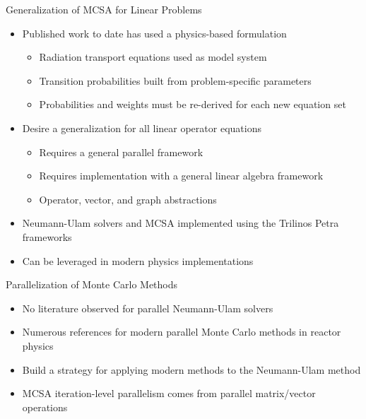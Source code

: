 \documentclass{beamer}
\begin{document}
\begin{frame}{Generalization of MCSA for Linear Problems}

  \begin{itemize}
  \item Published work to date has used a physics-based formulation
    \begin{itemize}
    \item Radiation transport equations used as model system
    \item Transition probabilities built from problem-specific
      parameters
    \item Probabilities and weights must be re-derived for each new
      equation set
    \end{itemize}
    \medskip \medskip
  \item Desire a generalization for all linear operator equations
    \begin{itemize}
    \item Requires a general parallel framework
    \item Requires implementation with a general linear algebra
      framework
    \item Operator, vector, and graph abstractions
    \end{itemize}
    \medskip \medskip
  \item Neumann-Ulam solvers and MCSA implemented using the Trilinos
    Petra frameworks
    \medskip \medskip
  \item Can be leveraged in modern physics implementations
  \end{itemize}

\end{frame}

\begin{frame}{Parallelization of Monte Carlo Methods}

  \begin{itemize}
  \item No literature observed for parallel Neumann-Ulam solvers
    \medskip \medskip
  \item Numerous references for modern parallel Monte Carlo methods in
    reactor physics
    \medskip \medskip
  \item Build a strategy for applying modern methods to the
    Neumann-Ulam method
    \medskip \medskip
  \item MCSA iteration-level parallelism comes from parallel
    matrix/vector operations
  \end{itemize}

\end{frame}
\end{document}
